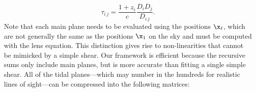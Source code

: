 \begin{equation}
\tau_{i\,j} = \frac{ 1 + z_i}{c} \frac{D_i D_j}{D_{i\,j}}.
\end{equation}
Note that each main plane needs to be evaluated using the positions $\x_\ell$, which are not generally the same as the positions $\x_1$ on the sky and must be computed with the lens equation. This distinction gives rise to non-linearities that cannot be mimicked by a simple shear. Our framework is efficient because the recursive sums only include main planes, but is more accurate than fitting a single simple shear. All of the tidal planes---which may number in the hundreds for realistic lines of sight---can be compressed into the following matrices: